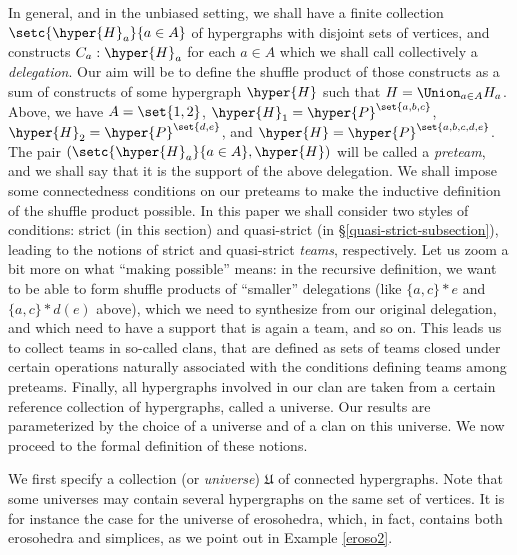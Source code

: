 In general, and in the unbiased setting, we shall  have a finite collection   $\setc{\hyper{H}_a}{a\in A}$ of hypergraphs with disjoint sets of vertices, and constructs $C_a:\hyper{H}_a$ for each $a\in A$ which we shall call collectively a \textit{delegation}.
Our aim will be  to define the shuffle product of those constructs  as a sum of constructs of some hypergraph $\hyper{H}$ such that $H=\Union_{a\in A}H_a$. Above, we have $A=\set{1,2}$,
 $\hyper{H}_1 = \hyper{P}^{\set{a,b,c}}$, $\hyper{H}_2 = \hyper{P}^{\set{d,e}}$, and $\hyper{H}=\hyper{P}^{\set{a,b,c,d,e}}$. The pair $(\setc{\hyper{H}_a}{a\in A},\hyper{H})$ will be called a \textit{preteam}, and we shall say that it is the support of the above delegation.  We shall impose some connectedness conditions on our preteams to make the inductive definition of the shuffle product possible.  In this paper we shall consider two styles of conditions: strict (in this section) and quasi-strict (in \S\ref{quasi-strict-subsection}), leading to the notions of strict and quasi-strict \textit{teams}, respectively.  Let us zoom a bit more on what ``making possible'' means:  in the recursive definition, we want to be able to form shuffle products of ``smaller'' delegations (like $\{a,c\}\ast e$ and $\{a,c\}\ast d(e)$ above), which we need to synthesize from our original delegation, and which need to have a  support that is again a team, and so on.  This leads us to collect teams in so-called clans, that are defined as sets of teams closed under certain operations naturally associated with the conditions defining teams among preteams. Finally, all hypergraphs involved in our clan are taken from a certain reference collection of hypergraphs, called a universe. Our results are parameterized by the choice of a universe and of a clan on this universe. We now proceed to the formal definition of these notions.



We first specify a collection (or {\em universe}) $\mathfrak U$ of connected hypergraphs.  Note that some universes may contain several hypergraphs on the same set of vertices. It is for instance the case for the universe of erosohedra,  which, in fact, contains both erosohedra and simplices, as we point out in  Example \ref{eroso2}.


